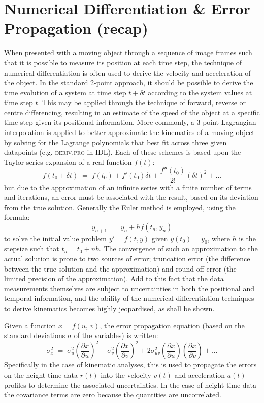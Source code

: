 \documentclass[preprint2]{aastex}
\begin{document}
\section{Numerical Differentiation \& Error Propagation (recap)}
When presented with a moving object through a sequence of image frames such that it is possible to measure its position at each time step, the technique of numerical differentiation is often used to derive the velocity and acceleration of the object. In the standard 2-point approach, it should be possible to derive the time evolution of a system at time step $t+\delta t$ according to the system values at time step $t$. This may be applied through the technique of forward, reverse or centre differencing, resulting in an estimate of the speed of the object at a specific time step given its positional information. More commonly, a 3-point Lagrangian interpolation is applied to better approximate the kinematics of a moving object by solving for the Lagrange polynomials that best fit across three given datapoints (e.g. \textsc{deriv.pro} in IDL). Each of these schemes is based upon the Taylor series expansion of a real function $f(t)$:
\begin{equation}
\label{taylor1}
f(t_0+\delta t) \; = \; f(t_0)+f'(t_0)\delta t +  \frac{f''(t_0)}{2!}(\delta t)^{2}  + ...
\end{equation}
but due to the approximation of an infinite series with a finite number of terms and iterations, an error must be associated with the result, based on its deviation from the true solution. Generally the Euler method is employed, using the formula:
\begin{equation}
y_{n+1} \; = \; y_n + h f(t_n, y_n)
\end{equation}
to solve the initial value problem $y'=f(t,y)$ given $y(t_0)=y_0$, where $h$ is the stepsize such that $t_n=t_0+nh$. The convergence of such an approximation to the actual solution is prone to two sources of error; truncation error (the difference between the true solution and the approximation) and round-off error (the limited precision of the approximation). Add to this fact that the data measurements themselves are subject to uncertainties in both the positional and temporal information, and the ability of the numerical differentiation techniques to derive kinematics becomes highly jeopardised, as shall be shown.

Given a function $x=f(u,\,v)$, the error propagation equation (based on the standard deviations $\sigma$ of the variables) is written:
\begin{equation}
\label{eqn_errorprop}
\sigma_x^2 \; = \; \sigma_u^2 \left(\frac{\partial x}{\partial u}\right) ^2 + \sigma_v^2 \left( \frac{\partial x}{\partial v} \right) ^2 + 2 \sigma_{uv}^2 \left( \frac{\partial x}{\partial u} \right) \left( \frac{\partial x}{\partial v} \right) + ...
\end{equation}
Specifically in the case of kinematic analyses, this is used to propagate the errors on the height-time data $r(t)$ into the velocity $v(t)$ and acceleration $a(t)$ profiles to determine the associated uncertainties. In the case of height-time data the covariance terms are zero because the quantities are uncorrelated.
\end{document}
